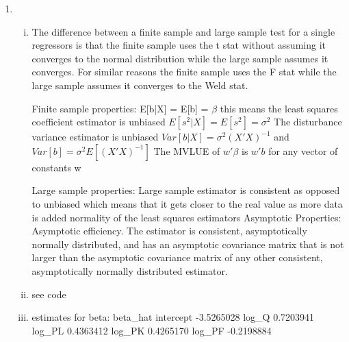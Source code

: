 \documentclass{article}
\begin{document}
	\maketitle
	\begin{enumerate}
		\item
			\begin{enumerate}[i)]
				\item The difference between a finite sample and large sample test for a single regressors is that the finite sample uses the t stat without assuming it converges to the normal distribution while the large sample assumes it converges. For similar reasons the finite sample uses the F stat while the large sample assumes it converges to the Weld stat.
				
				Finite sample properties:  \newline
				E[b|X] = E[b] = $\beta$ this means the least squares coefficient estimator is unbiased
				$E[s^2|X] = E[s^2] = \sigma^2$ The disturbance variance  estimator is unbiased \newline
				$Var[b|X] = \sigma^2(X'X)^{-1}$ and $Var[b] = \sigma^2E[(X'X)^{-1}]$ \newline
				The MVLUE of $w'\beta$ is $w'b$ for any vector of constants w \newline 
				
				 Large sample properties: 
				 Large sample estimator is consistent as opposed to unbiased which means that it gets closer to the real value as more data is added\newline
				normality of the least squares estimators \newline \newline
				Asymptotic Properties: \newline
				Asymptotic efficiency. The estimator is consistent, asymptotically normally distributed, and has an asymptotic covariance matrix that is not larger than the asymptotic covariance matrix of any other consistent, asymptotically normally distributed estimator. \newline
				\item see code
				\item estimates for beta: \newline
				beta\_hat \newline
				[,1] \newline
				intercept -3.5265028 \newline
				log\_Q      0.7203941 \newline
				log\_PL     0.4363412 \newline
				log\_PK     0.4265170 \newline
				log\_PF    -0.2198884 \newline
				

\end{enumerate}
\end{enumerate}
\end{document}
